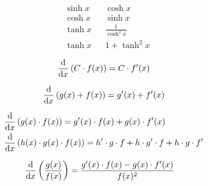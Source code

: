 \begin{boxleft}
\end{boxleft}\begin{boxrightshaded}
 \begin{align} 
  &\sinh x& &\cosh x\\
  &\cosh x& &\sinh x\\
  &\tanh x& &\frac{1}{\cosh^2 x}\\
  &\tanh x& &1+\tanh^2 x
\end{align}\end{boxrightshaded}
          
\begin{boxleft}
\end{boxleft}\begin{boxrightshaded}
 \begin{align} 
\frac{\mathop{}\!\mathrm{d} }{\mathop{}\!\mathrm{d} x}\left(C\cdot f(x)\right)=C\cdot f'(x)
 \end{align}\end{boxrightshaded}

\begin{boxleft}
\end{boxleft}\begin{boxrightshaded}
 \begin{align} 
\frac{\mathop{}\!\mathrm{d} }{\mathop{}\!\mathrm{d} x}\left(g(x) + f(x)\right)=g'(x)+f'(x)
 \end{align}\end{boxrightshaded}

\begin{boxleft}
\end{boxleft}\begin{boxrightshaded}
 \begin{align} 
\frac{\mathop{}\!\mathrm{d} }{\mathop{}\!\mathrm{d} x}&\left(g(x)\cdot f(x)\right)=g'(x)\cdot f(x)+g(x)\cdot f'(x)\\
\frac{\mathop{}\!\mathrm{d} }{\mathop{}\!\mathrm{d} x}&\left(h(x)\cdot g(x)\cdot f(x)\right)=h'\cdot g\cdot f+h\cdot g'\cdot f+h\cdot g\cdot f'
 \end{align}\end{boxrightshaded}
            
\begin{boxleft}
\end{boxleft}\begin{boxrightshaded}
 \begin{align} 
\frac{\mathop{}\!\mathrm{d} }{\mathop{}\!\mathrm{d} x}\left(\frac{g(x)}{f(x)}\right)&=\frac{g'(x)\cdot f(x)-g(x)\cdot f'(x)}{f(x)^2}
 \end{align}\end{boxrightshaded}
            
